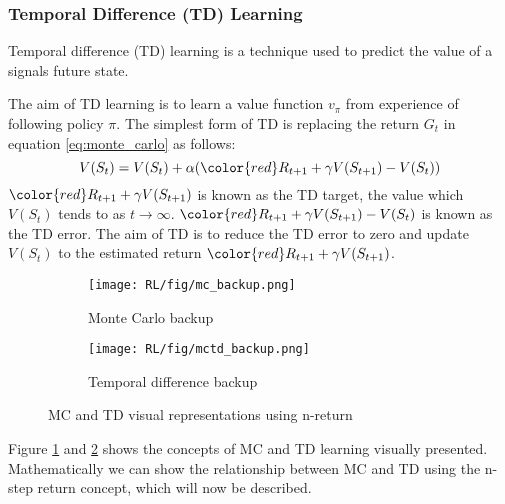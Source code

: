 \subsubsection{Temporal Difference (TD) Learning}
Temporal difference (TD) learning is a technique used to predict the value of a signals future state.

The aim of TD learning is to learn a value function $v_\pi$ from experience of following policy $\pi$. 
The simplest form of TD is replacing the return $G_t$ in equation \ref{eq:monte_carlo} as follows:
\begin{equation}
	V(S_t) = V(S_t) + \alpha({\color{red}R_{t+1} +  \gamma V(S_{t+1})} - V(S_t))
	\label{eq:monte_carlo_TD}
\end{equation}
${\color{red}R_{t+1} +  \gamma V(S_{t+1})}$ is known as the TD target, the value which $V(S_t)$ tends to as $t \to \infty$.
${\color{red}R_{t+1} +  \gamma V(S_{t+1})} - V(S_t)$ is known as the TD error. The aim of TD is to reduce the TD error to zero and update $V(S_t)$ to the estimated return ${\color{red}R_{t+1} +  \gamma V(S_{t+1})}$.
\begin{figure}[!htb]
	\centering
	\begin{subfigure}{.5\textwidth}
		\centering
		\texttt{[image: RL/fig/mc\_backup.png]}
		\caption{Monte Carlo backup\cite{David_Silver}}
		\label{fig:monte_carlo_backup}
	\end{subfigure}
	\begin{subfigure}{.49\textwidth}
	\centering
	\texttt{[image: RL/fig/mctd\_backup.png]}
	\caption{Temporal difference backup\cite{David_Silver}}
	\label{fig:monte_carlo_TD_backup}
	\end{subfigure}
	\caption{MC and TD visual representations using n-return \cite{David_Silver}}
	\label{fig:MC_TD_backups}
\end{figure}

\begin{figure}[!htb]

\end{figure}
Figure \ref{fig:monte_carlo_backup} and \ref{fig:monte_carlo_TD_backup} shows the concepts of MC and TD learning visually presented. Mathematically we can show the relationship between MC and TD using the n-step return concept, which will now be described.

